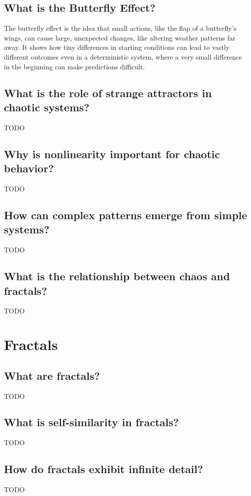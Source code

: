 \documentclass[12pt]{article}
\begin{document}
\subsection{What is the Butterfly Effect?}

The butterfly effect is the idea that small actions, like the flap of a butterfly’s wings, can cause large, unexpected changes, like altering weather patterns far away. It shows how tiny differences in starting conditions can lead to vastly different outcomes even in a deterministic system, where a very small difference in the beginning can make predictions difficult.

\subsection{What is the role of strange attractors in chaotic systems?}
TODO

\subsection{Why is nonlinearity important for chaotic behavior?}
TODO

\subsection{How can complex patterns emerge from simple systems?}
TODO

\subsection{What is the relationship between chaos and fractals?}
TODO

\section{Fractals}
\subsection{What are fractals?}
TODO

\subsection{What is self-similarity in fractals?}
TODO

\subsection{How do fractals exhibit infinite detail?}
TODO
\end{document}

